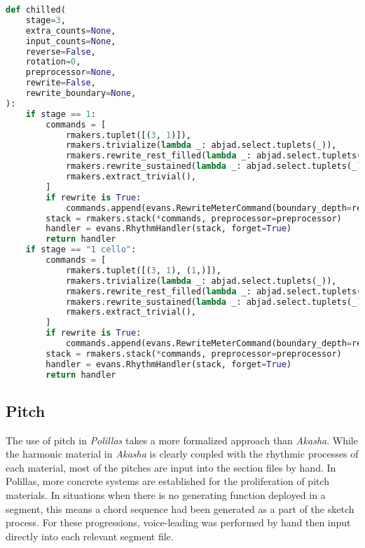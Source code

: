 \begin{lstlisting}[language=Python,frame=tb,caption={Stage 1 of material E rhythms in Polillas},label=lst:p-e-rhythm]
def chilled(
    stage=3,
    extra_counts=None,
    input_counts=None,
    reverse=False,
    rotation=0,
    preprocessor=None,
    rewrite=False,
    rewrite_boundary=None,
):
    if stage == 1:
        commands = [
            rmakers.tuplet([(3, 1)]),
            rmakers.trivialize(lambda _: abjad.select.tuplets(_)),
            rmakers.rewrite_rest_filled(lambda _: abjad.select.tuplets(_)),
            rmakers.rewrite_sustained(lambda _: abjad.select.tuplets(_)),
            rmakers.extract_trivial(),
        ]
        if rewrite is True:
            commands.append(evans.RewriteMeterCommand(boundary_depth=rewrite_boundary))
        stack = rmakers.stack(*commands, preprocessor=preprocessor)
        handler = evans.RhythmHandler(stack, forget=True)
        return handler
    if stage == "1 cello":
        commands = [
            rmakers.tuplet([(3, 1), (1,)]),
            rmakers.trivialize(lambda _: abjad.select.tuplets(_)),
            rmakers.rewrite_rest_filled(lambda _: abjad.select.tuplets(_)),
            rmakers.rewrite_sustained(lambda _: abjad.select.tuplets(_)),
            rmakers.extract_trivial(),
        ]
        if rewrite is True:
            commands.append(evans.RewriteMeterCommand(boundary_depth=rewrite_boundary))
        stack = rmakers.stack(*commands, preprocessor=preprocessor)
        handler = evans.RhythmHandler(stack, forget=True)
        return handler
\end{lstlisting}

\subsection{Pitch}

The use of pitch in \textit{Polillas} takes a more formalized approach than \textit{Akasha}. While the harmonic material in \textit{Akasha} is clearly coupled with the rhythmic processes of each material, most of the pitches are input into the section files by hand. In Polillas, more concrete systems are established for the proliferation of pitch materials. In situations when there is no generating function deployed in a segment, this means a chord sequence had been generated as a part of the sketch process. For these progressions, voice-leading was performed by hand then input directly into each relevant segment file.

